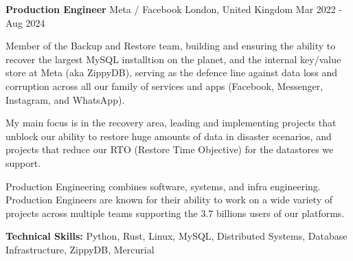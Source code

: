 

\begin{cventries}

	\cventry
	{\textbf{Production Engineer}} %
	{Meta / Facebook} %
	{London, United Kingdom} %
	{Mar 2022 - Aug 2024} %
	{
		\begin{cvitems} %
			\item {Member of the Backup and Restore team, building and ensuring the ability to recover the largest MySQL
			            installtion on the planet, and the internal key/value store at Meta (aka ZippyDB), serving as the defence line
			            against data loss and corruption across all our family of services and apps (Facebook, Messenger, Instagram, and
			            WhatsApp).}
			\item {My main focus is in the recovery area, leading and implementing projects that unblock our ability to
			            restore huge amounts of data in disaster scenarios, and projects that reduce our RTO (Restore Time Objective)
			            for the datastores we support.}
			\item {Production Engineering combines software, systems, and infra engineering. Production Engineers are known
			            for their ability to work on a wide variety of projects across multiple teams supporting the 3.7 billions users
			            of our platforms.}
			\item {\textbf{Technical Skills:} Python, Rust, Linux, MySQL, Distributed Systems, Database Infrastructure, ZippyDB, Mercurial}
		\end{cvitems}
	}


\end{cventries}
